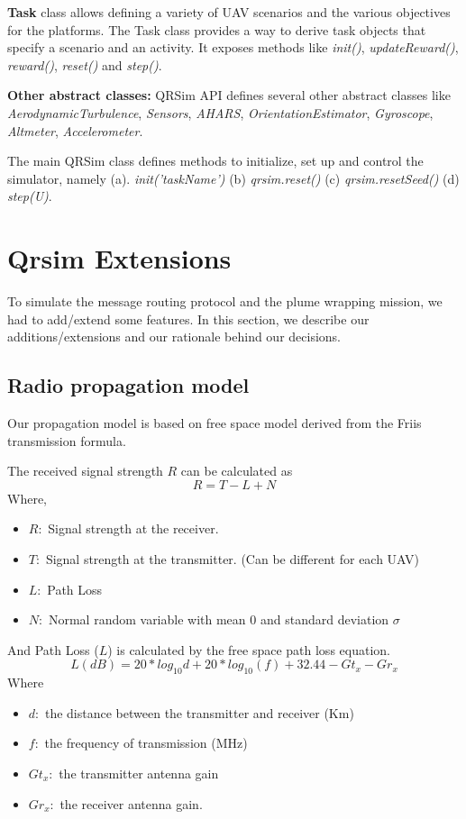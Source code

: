 \textbf{Task} class allows defining a variety of UAV scenarios and the various objectives for the platforms. The Task class provides a way to derive task objects that specify a scenario and an activity. It exposes methods like \emph{init()}, \emph{updateReward()}, \emph{reward()}, \emph{reset()} and \emph{step()}.

\textbf{Other abstract classes:} QRSim API defines several other abstract classes like \emph{AerodynamicTurbulence}, \emph{Sensors}, \emph{AHARS}, \emph{OrientationEstimator}, \emph{Gyroscope}, \emph{Altmeter}, \emph{Accelerometer}.

The main QRSim class defines methods to initialize, set up and control the simulator, namely (a). \emph{init('taskName')} (b) \emph{qrsim.reset()} (c) \emph{qrsim.resetSeed()} (d) \emph{step(U)}.

\section{Qrsim Extensions}

To simulate the message routing protocol and the plume wrapping mission, we had to add/extend some features. In this section, we describe our additions/extensions and our rationale behind our decisions.

\subsection{Radio propagation model} \label{free_space_path_loss}
Our propagation model is based on free space model derived from the Friis transmission formula. \cite{5735774}

The received signal strength $R$ can be calculated as 
\begin{equation}
    R = T - L + N
\end{equation} 
Where,
\begin{itemize}
    \item $R : $ Signal strength at the receiver.
    \item $T : $ Signal strength at the transmitter. (Can be different for each UAV)
    \item $L : $ Path Loss
    \item $N : $ Normal random variable with mean $0$ and standard deviation $\sigma$
\end{itemize}
And Path Loss ($L$) is calculated by the free space path loss equation.
\begin{equation}
 L (dB) = 20 * log_{10} d + 20 * log_{10}(f) + 32.44 - Gt_x - Gr_x 
\end{equation}
Where
\begin{itemize}
    \item $d : $ the distance between the transmitter and receiver (Km)
	\item $f : $ the frequency of transmission (MHz)
    \item $Gt_x : $ the transmitter antenna gain 
    \item $Gr_x : $ the receiver antenna gain.
\end{itemize}

